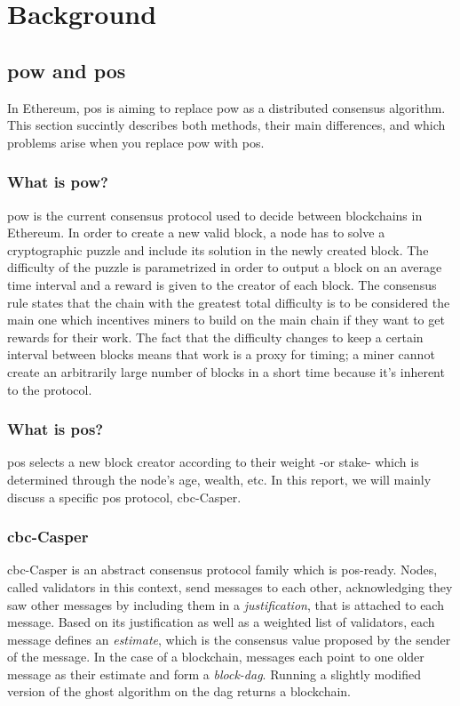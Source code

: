 \chapter{Background}
\label{chap:background}

\section{\gls{pow} and \gls{pos}}
In Ethereum, \gls{pos} is aiming to replace \gls{pow} as a distributed consensus
algorithm. This section succintly describes both methods, their main
differences, and which problems arise when you replace \gls{pow} with \gls{pos}.

\subsection{What is \gls{pow}?}
\gls{pow} is the current consensus protocol used to decide between blockchains
in Ethereum. In order to create a new valid block, a node has to solve a
cryptographic puzzle and include its solution in the newly created block. The
difficulty of the puzzle is parametrized in order to output a block on an
average time interval and a reward is given to the creator of each block.  The
consensus rule states that the chain with the greatest total difficulty is to be
considered the main one which incentives miners to build on the main chain if
they want to get rewards for their work. The fact that the difficulty changes to
keep a certain interval between blocks means that work is a proxy for timing; a
miner cannot create an arbitrarily large number of blocks in a short time
because it's inherent to the protocol.


\subsection{What is \gls{pos}?}
\gls{pos} selects a new block creator according to their weight -or stake- which
is determined through the node's age, wealth, etc. In this report, we will
mainly discuss a specific \gls{pos} protocol, \gls{cbc}-Casper.

\subsection{\gls{cbc}-Casper}
\label{ssec:cbc}
\FloatBarrier
\gls{cbc}-Casper \cite{abstractCBC} \cite{abstractCBC2} is an abstract consensus
protocol family which is \gls{pos}-ready. Nodes, called validators in this
context, send messages to each other, acknowledging they saw other messages by
including them in a \textit{justification}, that is attached to each message.
Based on its justification as well as a weighted list of validators, each
message defines an \textit{estimate}, which is the consensus value proposed by
the sender of the message. In the case of a blockchain, messages each point to
one older message as their estimate and form a \textit{block-\gls{dag}}. Running
a slightly modified version of the \gls{ghost} algorithm on the \gls{dag}
\cite{abstractCBC} \cite{GHOST} returns a blockchain.


